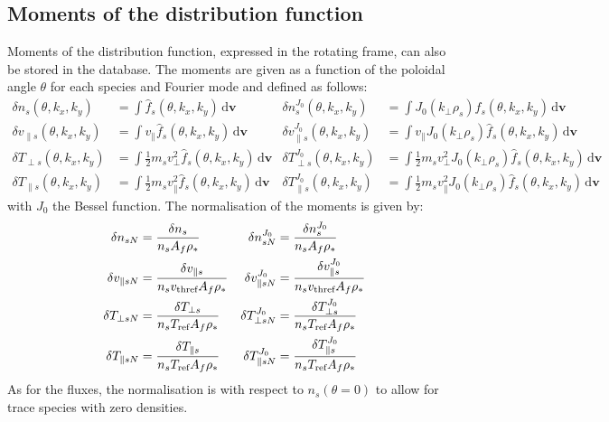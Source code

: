 \documentclass[a4paper]{report}
\begin{document}
\subsection{Moments of the distribution function} \label{sec:moments}
Moments of the distribution function, expressed in the rotating frame, can also be stored in the database. The moments are given as a function of the poloidal angle $\theta$ for each species and Fourier mode and defined as follows:
\begin{align*}
\delta n_s(\theta,k_x,k_y) & =  \int \hat{f}_s(\theta,k_x,k_y) \,\textrm{d}\mathbf{v}& \delta n_s^{J_0}(\theta,k_x,k_y) & =  \int J_0(k_\perp\rho_s) \hat{f}_s(\theta,k_x,k_y) \,\textrm{d}\mathbf{v} \\
\delta v_{\parallel s}(\theta,k_x,k_y) & =  \int v_\parallel \hat{f}_s(\theta,k_x,k_y) \,\textrm{d}\mathbf{v}& \delta v_{\parallel s}^{J_0}(\theta,k_x,k_y) & =  \int v_\parallel J_0(k_\perp\rho_s) \hat{f}_s(\theta,k_x,k_y) \,\textrm{d}\mathbf{v}\\
\delta T_{\perp s}(\theta,k_x,k_y) & =  \int \frac{1}{2}m_s v_\perp^2 \hat{f}_s(\theta,k_x,k_y) \,\textrm{d}\mathbf{v}& \delta T_{\perp s}^{J_0}(\theta,k_x,k_y) & =  \int \frac{1}{2}m_s v_\perp^2 J_0(k_\perp\rho_s) \hat{f}_s(\theta,k_x,k_y) \,\textrm{d}\mathbf{v}\\
\delta T_{\parallel s}(\theta,k_x,k_y) & =  \int \frac{1}{2}m_s v_\parallel^2 \hat{f}_s(\theta,k_x,k_y) \,\textrm{d}\mathbf{v}& \delta T_{\parallel s}^{J_0}(\theta,k_x,k_y) & =  \int \frac{1}{2}m_s v_\parallel^2 J_0(k_\perp\rho_s) \hat{f}_s(\theta,k_x,k_y) \,\textrm{d}\mathbf{v}
\end{align*}
with $J_0$ the Bessel function. The normalisation of the moments is given by:
\begin{align*}
\delta n_{sN} & = \frac{\delta n_s}{n_s A_f\rho_*}& \delta n_{sN}^{J_0} & = \frac{\delta n_s^{J_0}}{n_s A_f\rho_*} \\
\delta v_{\parallel sN} & = \frac{\delta v_{\parallel s}}{n_sv_\textrm{thref} A_f\rho_*}& \delta v_{\parallel sN}^{J_0} & = \frac{\delta v_{\parallel s}^{J_0}}{n_sv_\textrm{thref} A_f\rho_*} \\
\delta T_{\perp sN} & = \frac{\delta T_{\perp s}}{n_s T_{\textrm{ref}} A_f\rho_*}& \delta T_{\perp sN}^{J_0} & = \frac{\delta T_{\perp s}^{J_0}}{n_s T_{\textrm{ref}} A_f\rho_*} \\
\delta T_{\parallel sN} & = \frac{\delta T_{\parallel s}}{n_s T_{\textrm{ref}} A_f\rho_*}& \delta T_{\parallel sN}^{J_0} & = \frac{\delta T_{\parallel s}^{J_0}}{n_s T_{\textrm{ref}} A_f\rho_*} 
\end{align*}
As for the fluxes, the normalisation is with respect to $n_s(\theta=0)$ to allow for trace species with zero densities. 
\end{document}
